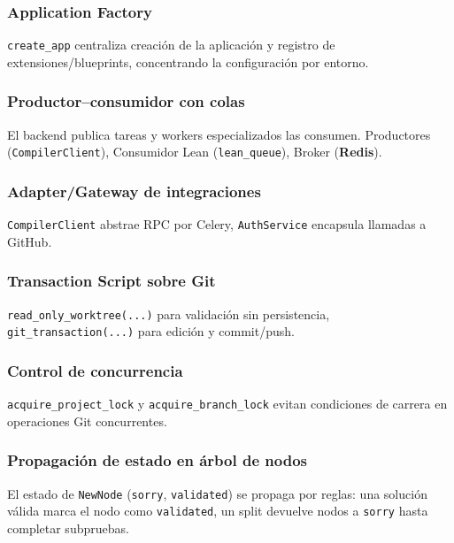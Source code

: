 \documentclass[12pt, letterpaper]{article}
\begin{document}
\subsubsection{Application Factory}

\texttt{create\_app} centraliza creación de la aplicación y registro de extensiones/blueprints, concentrando la configuración por entorno.

\subsubsection{Productor–consumidor con colas}

El backend publica tareas y workers especializados las consumen. Productores (\texttt{CompilerClient}), Consumidor Lean (\texttt{lean\_queue}), Broker (\textbf{Redis}).

\subsubsection{Adapter/Gateway de integraciones}

\texttt{CompilerClient} abstrae RPC por Celery, \texttt{AuthService} encapsula llamadas a GitHub.

\subsubsection{Transaction Script sobre Git}

\texttt{read\_only\_worktree(...)} para validación sin persistencia, \texttt{git\_transaction(...)} para edición y commit/push.

\subsubsection{Control de concurrencia}

\texttt{acquire\_project\_lock} y \texttt{acquire\_branch\_lock} evitan condiciones de carrera en operaciones Git concurrentes.

\subsubsection{Propagación de estado en árbol de nodos}

El estado de \texttt{NewNode} (\texttt{sorry}, \texttt{validated}) se propaga por reglas: una solución válida marca el nodo como \texttt{validated}, un split devuelve nodos a \texttt{sorry} hasta completar subpruebas.
\end{document}
